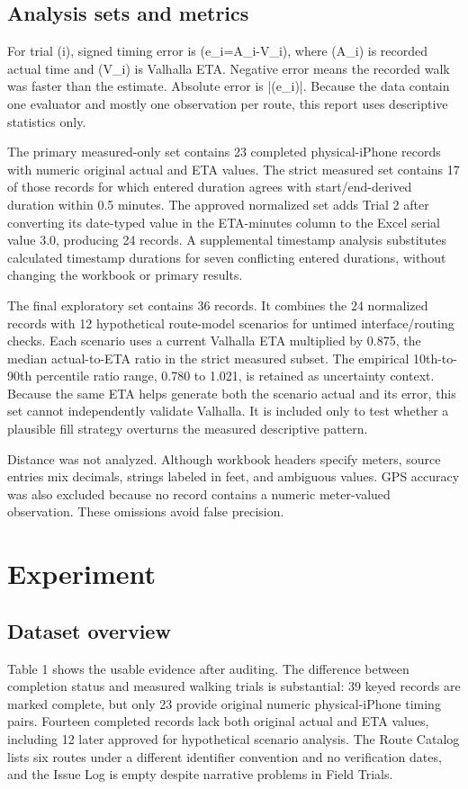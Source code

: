 \documentclass[9pt,twocolumn]{article}
\begin{document}
\subsection{Analysis sets and metrics}
For trial (i), signed timing error is (e\_i=A\_i-V\_i), where (A\_i) is recorded actual time and (V\_i) is Valhalla ETA. Negative error means the recorded walk was faster than the estimate. Absolute error is |(e\_i)|. Because the data contain one evaluator and mostly one observation per route, this report uses descriptive statistics only.

The primary measured-only set contains 23 completed physical-iPhone records with numeric original actual and ETA values. The strict measured set contains 17 of those records for which entered duration agrees with start/end-derived duration within 0.5 minutes. The approved normalized set adds Trial 2 after converting its date-typed value in the ETA-minutes column to the Excel serial value 3.0, producing 24 records. A supplemental timestamp analysis substitutes calculated timestamp durations for seven conflicting entered durations, without changing the workbook or primary results.

The final exploratory set contains 36 records. It combines the 24 normalized records with 12 hypothetical route-model scenarios for untimed interface/routing checks. Each scenario uses a current Valhalla ETA multiplied by 0.875, the median actual-to-ETA ratio in the strict measured subset. The empirical 10th-to-90th percentile ratio range, 0.780 to 1.021, is retained as uncertainty context. Because the same ETA helps generate both the scenario actual and its error, this set cannot independently validate Valhalla. It is included only to test whether a plausible fill strategy overturns the measured descriptive pattern.

Distance was not analyzed. Although workbook headers specify meters, source entries mix decimals, strings labeled in feet, and ambiguous values. GPS accuracy was also excluded because no record contains a numeric meter-valued observation. These omissions avoid false precision.

\section{Experiment}
\subsection{Dataset overview}
Table 1 shows the usable evidence after auditing. The difference between completion status and measured walking trials is substantial: 39 keyed records are marked complete, but only 23 provide original numeric physical-iPhone timing pairs. Fourteen completed records lack both original actual and ETA values, including 12 later approved for hypothetical scenario analysis. The Route Catalog lists six routes under a different identifier convention and no verification dates, and the Issue Log is empty despite narrative problems in Field Trials.
\end{document}
